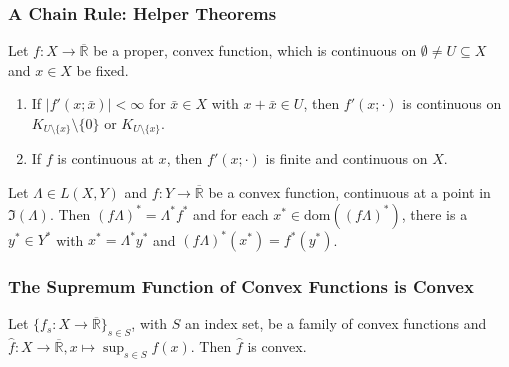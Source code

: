 \documentclass[10pt, hyperref={hidelinks}]{beamer}
\begin{document}
    \begin{frame}
        \frametitle{A Chain Rule: Helper Theorems}
        \pause
        \begin{theorem} \label{point_directional_derivative_continuity_theorem}
            Let \(f\colon X \to \overline{\mathbb{R}}\) be a proper, convex function, which is continuous on \(\emptyset \neq U \subseteq X\) and \(x \in X\) be fixed.
            \begin{enumerate}[label=(\roman*), wide]
                \item \label{point_directional_derivative_continuity_theorem_1} If \(|f'(x; \bar{x})| < \infty\) for \(\bar{x} \in X\) with \(x+\bar{x} \in U\), then \(f'(x; \cdot)\) is continuous on \(K_{U \setminus \{x\}} \setminus \{0\}\) or \(K_{U \setminus \{x\}}\).
                \item \label{point_directional_derivative_continuity_theorem_2} If \(f\) is continuous at \(x\), then \(f'(x; \cdot)\) is finite and continuous on \(X\).
            \end{enumerate}
        \end{theorem}
        \pause
        \begin{theorem} \label{adjoint_calculation_rule}
            Let \(\Lambda \in L(X, Y)\) and \(f\colon Y \to \overline{\mathbb{R}}\) be a convex function, continuous at a point in \(\Im(\Lambda)\). Then \((f\Lambda)^* = \Lambda^* f^*\) and for each \(x^* \in \text{dom}((f\Lambda)^*)\), there is a \(y^* \in Y^*\) with \(x^* = \Lambda^*y^*\) and \((f\Lambda)^*(x^*) = f^*(y^*)\).
        \end{theorem}
    \end{frame}

    \begin{frame}
        \frametitle{The Supremum Function of Convex Functions is Convex}

        \pause
    
        \begin{lemma} \label{supremum_convexity_lemma}
            Let \(\{f_s\colon X \to \overline{\mathbb{R}}\}_{s \in S}\), with \(S\) an index set, be a family of convex functions and \(\hat{f}\colon X \to \overline{\mathbb{R}}, x \mapsto \sup_{s \in S} f(x)\). Then \(\hat{f}\) is convex.
        \end{lemma}
    \end{frame}
\end{document}
